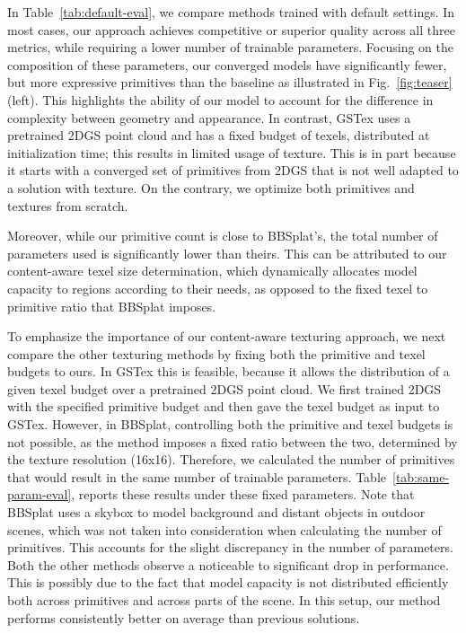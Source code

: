 In Table~\ref{tab:default-eval},
we compare methods trained with default settings.
In most cases,
our approach achieves competitive or superior quality across all three metrics,
while requiring a lower number of trainable parameters. %
Focusing on the composition of these parameters,
our converged models have significantly fewer,
but more expressive primitives than the baseline as illustrated in Fig.~\ref{fig:teaser} (left).
This highlights the ability of our model to account for the difference in complexity between geometry and appearance.
In contrast, GSTex uses a pretrained 2DGS point cloud and has a fixed budget of texels, distributed at initialization time; this results in limited usage of texture. 
This is in part because it starts with a converged set of primitives from 2DGS that is not well adapted to a solution with texture.
On the contrary, we optimize both primitives and textures from scratch.

Moreover,
while our primitive count is close to BBSplat's,
the total number of parameters used is significantly lower than theirs.
This can be attributed to our content-aware texel size determination,
which dynamically allocates model capacity to regions according to their needs,
as opposed to the fixed texel to primitive ratio that BBSplat imposes.

To emphasize the importance of our content-aware texturing approach,
we next compare the other texturing methods by fixing both the primitive and texel budgets to ours.
In GSTex this is feasible,
because it allows the distribution of a given texel budget over a pretrained 2DGS point cloud.
We first trained 2DGS with the specified primitive budget and then gave the texel budget as input to GSTex.
However,
in BBSplat, controlling both the primitive and texel budgets is not possible,
as the method imposes a fixed ratio between the two,
determined by the texture resolution (16x16).
Therefore,
we calculated the number of primitives that would result in the same number of trainable parameters.
Table~\ref{tab:same-param-eval},
reports these results under these fixed parameters.
Note that BBSplat uses a skybox to model background and distant objects in outdoor scenes,
which was not taken into consideration when calculating the number of primitives.
This accounts for the slight discrepancy in the number of parameters.
Both the other methods observe a noticeable to significant drop in performance.
This is possibly due to the fact that model capacity is not distributed efficiently both across primitives and across parts of the scene.
In this setup, our method performs consistently better on average than previous solutions.

